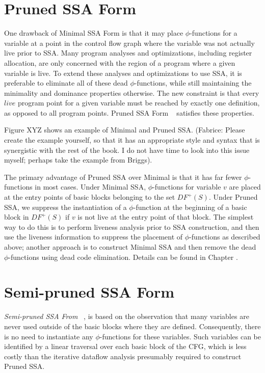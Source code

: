 \section{Pruned SSA Form}

One drawback of Minimal SSA Form is that it may place $\phi$-functions
for a variable at a point in the control flow graph where the variable was
not actually live prior to SSA. Many program analyses and optimizations,
including register allocation, are only concerned with the region of a 
program where a given variable is live. To extend these analyses and
optimizations to use SSA, it is preferable to eliminate all
of these dead $\phi$-functions, while still maintaining the minimality
and dominance properties otherwise. The new constraint is that every
$live$ program point for a given variable must be reached by exactly one
definition, as opposed to all program points.  Pruned SSA Form
~\cite{ChoiJan91} satisfies these properties. 

Figure XYZ shows an example of Minimal and Pruned SSA. 
(Fabrice: Please create the example yourself, so that it has an appropriate
style and syntax that is synergistic with the rest of the book. I do not have
time to look into this issue myself; perhaps take the example from Briggs). 

The primary advantage of Pruned SSA over Minimal is that it has far
fewer $\phi$-functions in most cases. 
Under Minimal SSA, $\phi$-functions for variable $v$ are placed at
the entry points of basic blocks belonging to the set $DF^{+}(S)$. 
Under Pruned SSA, we suppress the instantiation of a $\phi$-function
at the beginning of a basic block in $DF^{+}(S)$ if $v$ is not live
at the entry point of that block. The simplest way to do this is to
perform liveness analysis prior to SSA construction, and then
use the liveness information to suppress the placement of $\phi$-functions
as described above; another approach is to construct Minimal SSA
and then remove the dead $\phi$-functions using dead code
elimination. Details can be found in Chapter 
\label{chap:classical_construction}.


\section{Semi-pruned SSA Form}

\emph{Semi-pruned SSA From} ~\cite{BriggsJul98}, 
is based on the observation that
many variables are never used outside of the basic blocks
where they are defined. Consequently, there is no need 
to instantiate any $\phi$-functions for these variables.
Such variables can be identified by a linear traversal
over each basic block of the CFG, which is less costly
than the iterative dataflow analysis presumably required
to construct Pruned SSA. 
 
